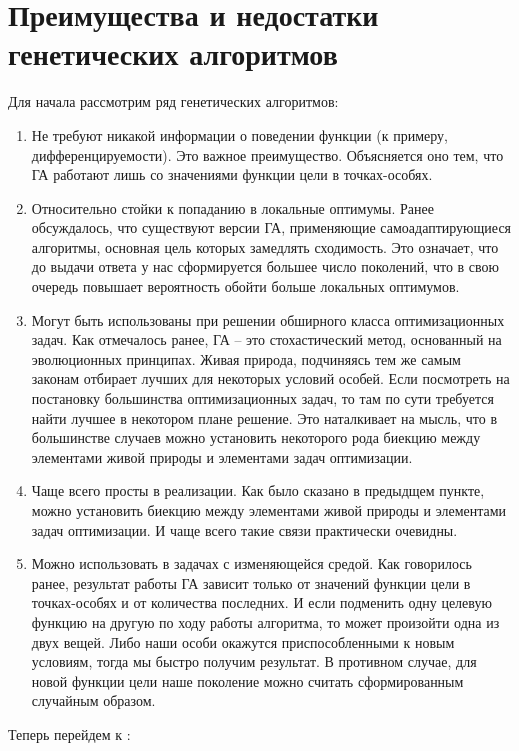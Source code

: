 \chapter{Преимущества и недостатки генетических алгоритмов}
Для начала рассмотрим ряд  генетических алгоритмов:
\begin{enumerate}
\item Не требуют никакой информации о поведении функции (к примеру, дифференцируемости). Это важное преимущество. Объясняется оно тем, что ГА работают лишь со значениями функции цели в точках-особях.
\item Относительно стойки к попаданию в локальные оптимумы. Ранее обсуждалось, что существуют версии ГА, применяющие самоадаптирующиеся алгоритмы, основная цель которых замедлять сходимость. Это означает, что до выдачи ответа у нас сформируется большее число поколений, что в свою очередь повышает вероятность обойти больше локальных оптимумов.
\item Могут быть использованы при решении обширного класса оптимизационных задач. Как отмечалось ранее, ГА -- это стохастический метод, основанный на эволюционных принципах. Живая природа, подчиняясь тем же самым законам отбирает лучших для некоторых условий особей. Если посмотреть на постановку большинства оптимизационных задач, то там по сути требуется найти лучшее в некотором плане решение. Это наталкивает на мысль, что в большинстве случаев можно установить некоторого рода биекцию между элементами живой природы и элементами задач оптимизации.
\item Чаще всего просты в реализации. Как было сказано в предыдщем пункте, можно установить биекцию между элементами живой природы и элементами задач оптимизации. И чаще всего такие связи практически очевидны.
\item Можно использовать в задачах с изменяющейся средой. Как говорилось ранее, результат работы ГА зависит только от значений функции цели в точках-особях и от количества последних. И если подменить одну целевую функцию на другую по ходу работы алгоритма, то может произойти одна из двух вещей. Либо наши особи окажутся приспособленными к новым условиям, тогда мы быстро получим результат. В противном случае, для новой функции цели наше поколение можно считать сформированным случайным образом. 
\end{enumerate}
Теперь перейдем к :
